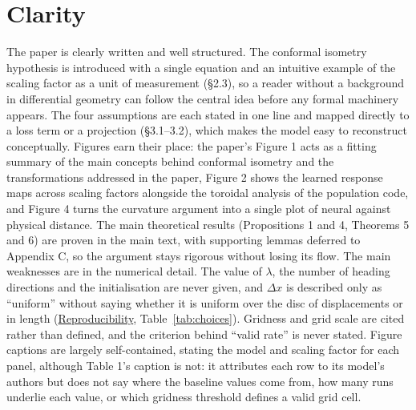 \documentclass[10pt,letterpaper]{article}
\begin{document}
\section{Clarity} \label{sec:clarity}
The paper is clearly written and well structured. The conformal isometry hypothesis is introduced with a single equation and an intuitive example of the scaling factor as a unit of measurement (\S2.3), so a reader without a background in differential geometry can follow the central idea before any formal machinery appears. The four assumptions are each stated in one line and mapped directly to a loss term or a projection (\S 3.1–3.2), which makes the model easy to reconstruct conceptually. Figures earn their place: the paper's Figure 1 acts as a fitting summary of the main concepts behind conformal isometry and the transformations addressed in the paper, Figure 2 shows the learned response maps across scaling factors alongside the toroidal analysis of the population code, and Figure 4 turns the curvature argument into a single plot of neural against physical distance. The main theoretical results (Propositions 1 and 4, Theorems 5 and 6) are proven in the main text, with supporting lemmas deferred to Appendix C, so the argument stays rigorous without losing its flow. The main weaknesses are in the numerical detail. The value of $\lambda$, the number of heading directions and the initialisation are never given, and $\Delta x$ is described only as “uniform” without saying whether it is uniform over the disc of displacements or in length (\hyperref[sec:repro]{Reproducibility}, Table~\ref{tab:choices}). Gridness and grid scale are cited rather than defined, and the criterion behind “valid rate” is never stated. Figure captions are largely self-contained, stating the model and scaling factor for each panel, although Table 1's caption is not: it attributes each row to its model’s authors but does not say where the baseline values come from, how many runs underlie each value, or which gridness threshold defines a valid grid cell. 
\end{document}
